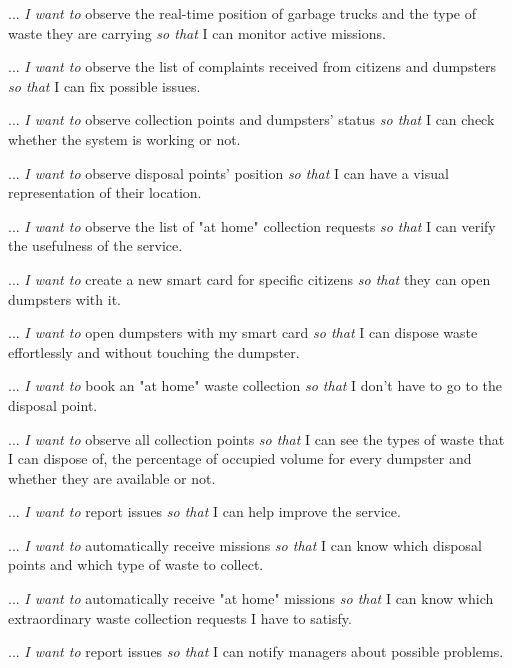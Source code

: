 \begin{story}
    ... \textit{I want to} observe the real-time position of garbage trucks and the type of waste they are carrying \textit{so that} I can monitor active missions.
\end{story}
\begin{story}
    ... \textit{I want to} observe the list of complaints received from citizens and dumpsters \textit{so that} I can fix possible issues.
\end{story}
\begin{story}
    ... \textit{I want to} observe collection points and dumpsters' status \textit{so that} I can check whether the system is working or not.
\end{story}
\begin{story}
    ... \textit{I want to} observe disposal points' position \textit{so that} I can have a visual representation of their location.
\end{story}
\begin{story}
    ... \textit{I want to} observe the list of "at home" collection requests \textit{so that} I can verify the usefulness of the service.
\end{story}
\begin{story}
    ... \textit{I want to} create a new smart card for specific citizens \textit{so that} they can open dumpsters with it.
\end{story}

\begin{story}
    ... \textit{I want to} open dumpsters with my smart card \textit{so that} I can dispose waste effortlessly and without touching the dumpster.
\end{story}
\begin{story}
    ... \textit{I want to} book an "at home" waste collection \textit{so that} I don't have to go to the disposal point.
\end{story}
\begin{story}
    ... \textit{I want to} observe all collection points \textit{so that} I can see the types of waste that I can dispose of, the percentage of occupied volume for every dumpster and whether they are available or not.
\end{story}
\begin{story}
    ... \textit{I want to} report issues \textit{so that} I can help improve the service.
\end{story}

\begin{story}
    ... \textit{I want to} automatically receive missions \textit{so that} I can know which disposal points and which type of waste to collect.
\end{story}
\begin{story}
    ... \textit{I want to} automatically receive "at home" missions \textit{so that} I can know which extraordinary waste collection requests I have to satisfy.
\end{story}
\begin{story}
    ... \textit{I want to} report issues \textit{so that} I can notify managers about possible problems.
\end{story}

